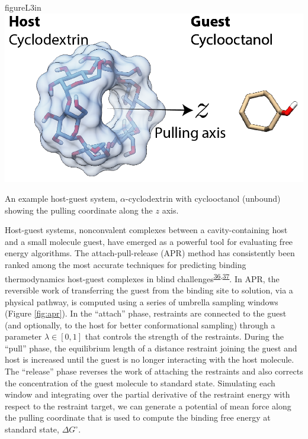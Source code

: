 \documentclass[11pt,notitlepage]{article}
\begin{document}
\begin{wrapfloat}{figure}{L}{3in}
\centering
\includegraphics{content/images/APR-annotated.png}
\caption{An example host-guest system, \(\alpha\)-cyclodextrin with
cyclooctanol (unbound) showing the pulling coordinate along the \(z\)
axis.}
\label{fig:apr}
\end{wrapfloat}

Host-guest systems, nonconvalent complexes between a cavity-containing
host and a small molecule guest, have emerged as a powerful tool for
evaluating free energy algorithms. The attach-pull-release (APR) method
has consistently been ranked among the most accurate techniques for
predicting binding thermodynamics host-guest complexes in blind
challenges\textsuperscript{\protect\hyperlink{ref-BGsUYQln}{36},\protect\hyperlink{ref-GA1AFcUw}{37}}.
In APR, the reversible work of transferring the guest from the binding
site to solution, via a physical pathway, is computed using a series of
umbrella sampling windows (Figure \ref{fig:apr}). In the ``attach''
phase, restraints are connected to the guest (and optionally, to the
host for better conformational sampling) through a parameter
\(\lambda \in [0, 1]\) that controls the strength of the restraints.
During the ``pull'' phase, the equilibrium length of a distance
restraint joining the guest and host is increased until the guest is no
longer interacting with the host molecule. The ``release'' phase
reverses the work of attaching the restraints and also corrects the
concentration of the guest molecule to standard state. Simulating each
window and integrating over the partial derivative of the restraint
energy with respect to the restraint target, we can generate a potential
of mean force along the pulling coordinate that is used to compute the
binding free energy at standard state, \(\Delta G^\circ\).
\end{document}

